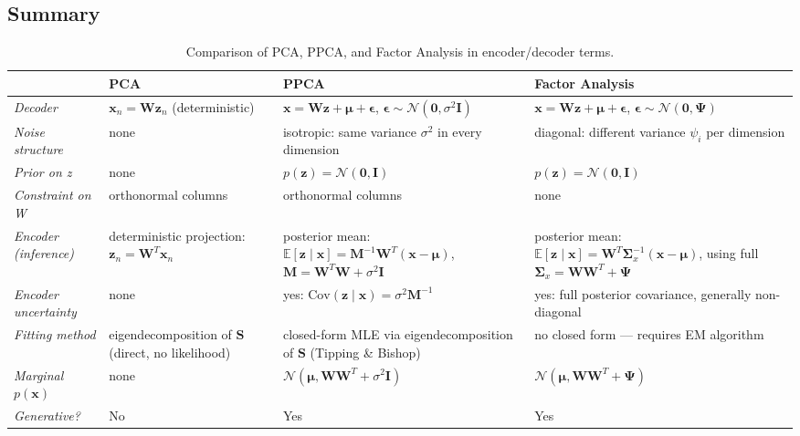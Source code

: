 \documentclass[11pt]{article}
\begin{document}
\subsection{Summary}
\begin{table}[H]
\centering
\renewcommand{\arraystretch}{1.4}
\begin{tabular}{|p{2.6cm}|p{3.4cm}|p{3.8cm}|p{4.2cm}|}
\hline
& \textbf{PCA} & \textbf{PPCA} & \textbf{Factor Analysis} \\
\hline
\textit{Decoder} &
$\mathbf{x}_n = \mathbf{W}\mathbf{z}_n$ (deterministic) &
$\mathbf{x} = \mathbf{Wz}+\boldsymbol{\mu}+\boldsymbol{\epsilon}$, $\boldsymbol{\epsilon}\sim\mathcal{N}(\mathbf{0},\sigma^2\mathbf{I})$ &
$\mathbf{x} = \mathbf{Wz}+\boldsymbol{\mu}+\boldsymbol{\epsilon}$, $\boldsymbol{\epsilon}\sim\mathcal{N}(\mathbf{0},\boldsymbol{\Psi})$ \\
\hline
\textit{Noise structure} &
none &
isotropic: same variance $\sigma^2$ in every dimension &
diagonal: different variance $\psi_i$ per dimension \\
\hline
\textit{Prior on z} &
none &
$p(\mathbf{z})=\mathcal{N}(\mathbf{0},\mathbf{I})$ &
$p(\mathbf{z})=\mathcal{N}(\mathbf{0},\mathbf{I})$ \\
\hline
\textit{Constraint on W} &
orthonormal columns &
orthonormal columns &
none \\
\hline
\textit{Encoder (inference)} &
deterministic projection: $\mathbf{z}_n = \mathbf{W}^T\mathbf{x}_n$ &
posterior mean: $\mathbb{E}[\mathbf{z}\mid\mathbf{x}] = \mathbf{M}^{-1}\mathbf{W}^T(\mathbf{x}-\boldsymbol{\mu})$, $\mathbf{M}=\mathbf{W}^T\mathbf{W}+\sigma^2\mathbf{I}$ &
posterior mean: $\mathbb{E}[\mathbf{z}\mid\mathbf{x}] = \mathbf{W}^T\boldsymbol{\Sigma}_x^{-1}(\mathbf{x}-\boldsymbol{\mu})$, using full $\boldsymbol{\Sigma}_x=\mathbf{WW}^T+\boldsymbol{\Psi}$ \\
\hline
\textit{Encoder uncertainty} &
none &
yes: $\text{Cov}(\mathbf{z}\mid\mathbf{x}) = \sigma^2\mathbf{M}^{-1}$ &
yes: full posterior covariance, generally non-diagonal \\
\hline
\textit{Fitting method} &
eigendecomposition of $\mathbf{S}$ (direct, no likelihood) &
closed-form MLE via eigendecomposition of $\mathbf{S}$ (Tipping \& Bishop) &
no closed form --- requires EM algorithm \\
\hline
\textit{Marginal $p(\mathbf{x})$} &
none &
$\mathcal{N}(\boldsymbol{\mu}, \mathbf{WW}^T+\sigma^2\mathbf{I})$ &
$\mathcal{N}(\boldsymbol{\mu}, \mathbf{WW}^T+\boldsymbol{\Psi})$ \\
\hline
\textit{Generative?} &
No &
Yes &
Yes \\
\hline
\end{tabular}
\caption{Comparison of PCA, PPCA, and Factor Analysis in encoder/decoder terms.}
\end{table}
\end{document}
